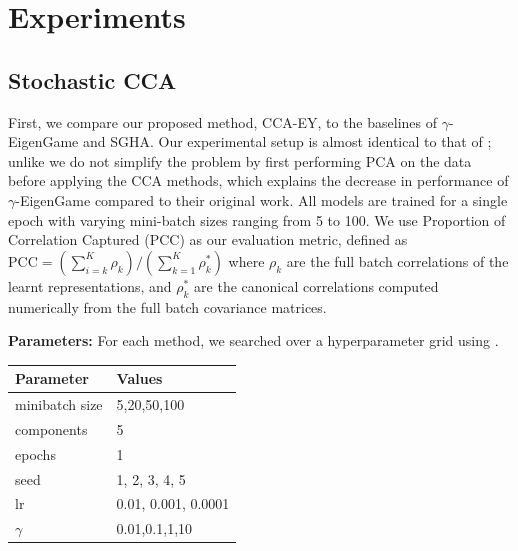 \section{Experiments}\label{Experiments}

\subsection{Stochastic CCA}
First, we compare our proposed method, CCA-EY, to the baselines of $\gamma$-EigenGame and SGHA.
Our experimental setup is almost identical to that of \cite{meng2021online, gemp2022generalized}; unlike \cite{gemp2022generalized} we do not simplify the problem by first performing PCA on the data before applying the CCA methods, which explains the decrease in performance of $\gamma$-EigenGame compared to their original work.
All models are trained for a single epoch with varying mini-batch sizes ranging from 5 to 100. We use Proportion of Correlation Captured (PCC) as our evaluation metric, defined as \( \text{PCC} = (\sum_{i=k}^K \rho_k)/ ({\sum_{k=1}^K \rho_k^*}) \) where $\rho_k$ are the full batch correlations of the learnt representations, and $\rho_k^*$ are the canonical correlations computed numerically from the full batch covariance matrices.

\textbf{Parameters:} For each method, we searched over a hyperparameter grid using \citet{wandb}.

\begin{table}[h!] 
\centering 
\begin{tabular}{|l|l|} 
\hline Parameter & Values \\ 
\hline minibatch size & 5,20,50,100 \\ 
\hline components & 5 \\ 
\hline epochs & 1 \\ 
\hline seed & 1, 2, 3, 4, 5 \\ 
\hline lr & 0.01, 0.001, 0.0001 \\ 
\hline $\gamma$\footnotemark & 0.01,0.1,1,10 \\ 
\hline 
\end{tabular}
\end{table}


